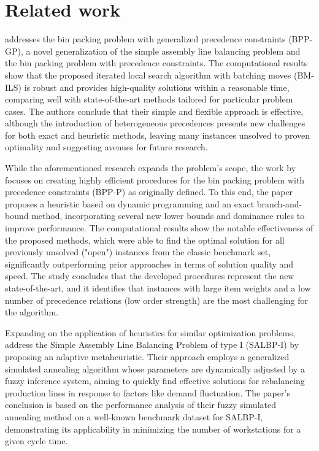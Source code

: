 \documentclass[12pt]{article}
\begin{document}
\section{Related work}

\cite{kramer:17} addresses the bin packing problem with generalized precedence constraints (BPP-GP), 
a novel generalization of the simple assembly line balancing problem and the bin packing problem 
with precedence constraints. The computational results show that the proposed iterated local search
algorithm with batching moves (BM-ILS) is robust and provides high-quality solutions within a 
reasonable time, comparing well with state-of-the-art methods tailored for particular problem cases. 
The authors conclude that their simple and flexible approach is effective, although the introduction
of heterogeneous precedences presents new challenges for both exact and heuristic methods, 
leaving many instances unsolved to proven optimality and suggesting avenues for future research.

While the aforementioned research expands the problem's scope, the work by \cite{pereira:16} focuses 
on creating highly efficient procedures for the bin packing problem with precedence constraints 
(BPP-P) as originally defined. To this end, the paper proposes a heuristic based on dynamic 
programming and an exact branch-and-bound method, incorporating several new lower bounds and dominance
rules to improve performance. The computational results show the notable effectiveness of the 
proposed methods, which were able to find the optimal solution for all previously unsolved ("open") 
instances from the classic benchmark set, significantly outperforming prior approaches in terms of 
solution quality and speed. The study concludes that the developed procedures represent the new 
state-of-the-art, and it identifies that instances with large item weights and a low number of 
precedence relations (low order strength) are the most challenging for the algorithm.

Expanding on the application of heuristics for similar optimization problems, \cite{lalaoui:18} address 
the Simple Assembly Line Balancing Problem of type I (SALBP-I) by proposing an adaptive metaheuristic. 
Their approach employs a generalized simulated annealing algorithm whose parameters are dynamically 
adjusted by a fuzzy inference system, aiming to quickly find effective solutions for rebalancing 
production lines in response to factors like demand fluctuation. The paper's conclusion is based on 
the performance analysis of their fuzzy simulated annealing method on a well-known benchmark dataset 
for SALBP-I, demonstrating its applicability in minimizing the number of workstations for a given 
cycle time.
\end{document}
